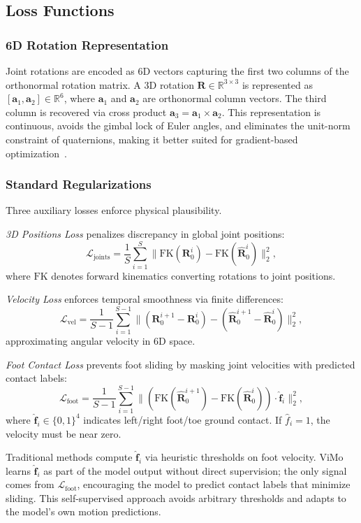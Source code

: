 \subsection{Loss Functions}
\label{sec:losses}

\subsubsection{6D Rotation Representation}
Joint rotations are encoded as 6D vectors capturing the first two columns of the orthonormal rotation matrix. A 3D rotation $\mathbf{R} \in \mathbb{R}^{3 \times 3}$ is represented as $[\mathbf{a}_1, \mathbf{a}_2] \in \mathbb{R}^6$, where $\mathbf{a}_1$ and $\mathbf{a}_2$ are orthonormal column vectors. The third column is recovered via cross product $\mathbf{a}_3 = \mathbf{a}_1 \times \mathbf{a}_2$. This representation is continuous, avoids the gimbal lock of Euler angles, and eliminates the unit-norm constraint of quaternions, making it better suited for gradient-based optimization~\cite{6drot2020}.

\subsubsection{Standard Regularizations}
Three auxiliary losses enforce physical plausibility.

\textit{3D Positions Loss} penalizes discrepancy in global joint positions:
\[
\mathcal{L}_{\text{joints}} = \frac{1}{S}\sum_{i=1}^{S} \| \text{FK}(\mathbf{R}_0^i) - \text{FK}(\hat{\mathbf{R}}_0^i) \|_2^2,
\]
where $\text{FK}$ denotes forward kinematics converting rotations to joint positions.

\textit{Velocity Loss} enforces temporal smoothness via finite differences:
\[
\mathcal{L}_{\text{vel}} = \frac{1}{S-1}\sum_{i=1}^{S-1} \| (\mathbf{R}_0^{i+1} - \mathbf{R}_0^i) - (\hat{\mathbf{R}}_0^{i+1} - \hat{\mathbf{R}}_0^i) \|_2^2,
\]
approximating angular velocity in 6D space.

\textit{Foot Contact Loss} prevents foot sliding by masking joint velocities with predicted contact labels:
\[
\mathcal{L}_{\text{foot}} = \frac{1}{S-1}\sum_{i=1}^{S-1} \| (\text{FK}(\hat{\mathbf{R}}_0^{i+1}) - \text{FK}(\hat{\mathbf{R}}_0^i)) \cdot \hat{\mathbf{f}}_i \|_2^2,
\]
where $\hat{\mathbf{f}}_i \in \{0,1\}^4$ indicates left/right foot/toe ground contact. If $\hat{f}_i = 1$, the velocity must be near zero.

Traditional methods compute $\hat{\mathbf{f}}_i$ via heuristic thresholds on foot velocity. ViMo learns $\hat{\mathbf{f}}_i$ as part of the model output without direct supervision; the only signal comes from $\mathcal{L}_{\text{foot}}$, encouraging the model to predict contact labels that minimize sliding. This self-supervised approach avoids arbitrary thresholds and adapts to the model's own motion predictions.

